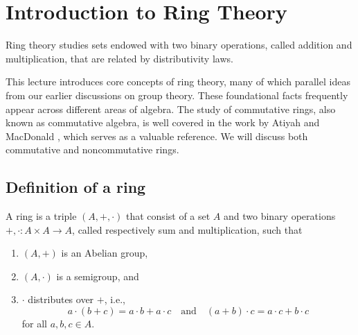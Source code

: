 \documentclass[11pt,a4paper]{article}
\begin{document}
\def\contador{Lesson 9}

\label{class:rings}

\section{Introduction to Ring Theory}

Ring theory studies sets endowed with two binary operations, called addition and multiplication, that are related by distributivity laws.

This lecture introduces core concepts of ring theory, many of which parallel ideas from our earlier discussions on group theory. These foundational facts frequently appear across different areas of  algebra. The study of commutative rings, also known as commutative algebra, is well covered in the work by Atiyah and MacDonald \parencite{atiyah1994}, which serves as a valuable reference.
We will discuss both commutative and noncommutative rings.


%

\subsection{Definition of a ring}

\begin{defi}
    A ring is a triple $(A,+,\cdot)$ that consist of a set  \(A\) and two binary operations \(+,\cdot\colon A\times A\to A\), called respectively sum and multiplication, such that 
\begin{enumerate}[label=(\roman*)]
    \item $(A,+)$ is an Abelian group,
    \item $(A,\cdot)$ is a semigroup, and
    \item \(\cdot\) distributes over \(+\), i.e., \[a \cdot (b+c) = a\cdot b + a\cdot c\quad\text{and}\quad(a+b)\cdot c= a\cdot c + b\cdot c\]
    for all \(a,b,c \in A\).
\end{enumerate}
\end{defi}
\end{document}

